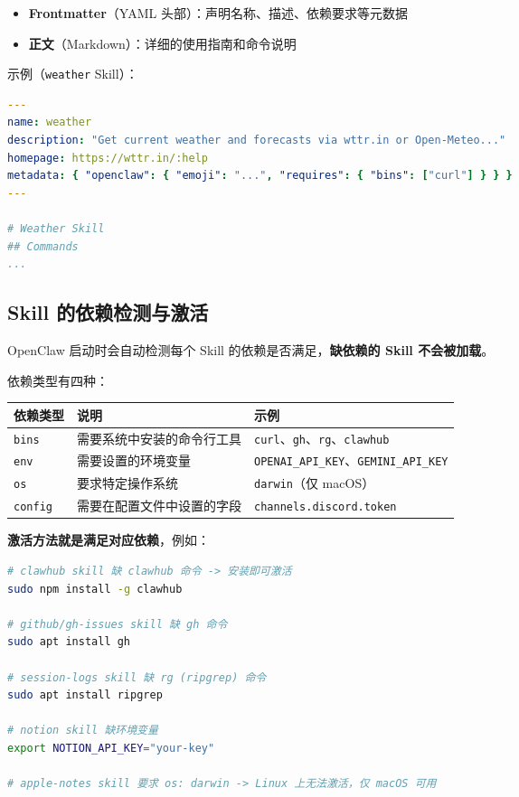 \begin{itemize}
  \item \textbf{Frontmatter}（YAML 头部）：声明名称、描述、依赖要求等元数据
  \item \textbf{正文}（Markdown）：详细的使用指南和命令说明
\end{itemize}

示例（\texttt{weather} Skill）：

\begin{lstlisting}[language=yaml]
---
name: weather
description: "Get current weather and forecasts via wttr.in or Open-Meteo..."
homepage: https://wttr.in/:help
metadata: { "openclaw": { "emoji": "...", "requires": { "bins": ["curl"] } } }
---

# Weather Skill
## Commands
...
\end{lstlisting}

\subsection{Skill 的依赖检测与激活}


OpenClaw 启动时会自动检测每个 Skill 的依赖是否满足，\textbf{缺依赖的 Skill 不会被加载}。

依赖类型有四种：

\begin{table}[h]
\centering
\small
\begin{tabular}{|l|l|l|}
\hline
依赖类型 & 说明 & 示例 \\
\hline
\texttt{bins} & 需要系统中安装的命令行工具 & \texttt{curl}、\texttt{gh}、\texttt{rg}、\texttt{clawhub} \\
\hline
\texttt{env} & 需要设置的环境变量 & \texttt{OPENAI\_API\_KEY}、\texttt{GEMINI\_API\_KEY} \\
\hline
\texttt{os} & 要求特定操作系统 & \texttt{darwin}（仅 macOS） \\
\hline
\texttt{config} & 需要在配置文件中设置的字段 & \texttt{channels.discord.token} \\
\hline
\end{tabular}
\end{table}

\textbf{激活方法就是满足对应依赖}，例如：

\begin{lstlisting}[language=bash]
# clawhub skill 缺 clawhub 命令 -> 安装即可激活
sudo npm install -g clawhub

# github/gh-issues skill 缺 gh 命令
sudo apt install gh

# session-logs skill 缺 rg (ripgrep) 命令
sudo apt install ripgrep

# notion skill 缺环境变量
export NOTION_API_KEY="your-key"

# apple-notes skill 要求 os: darwin -> Linux 上无法激活，仅 macOS 可用
\end{lstlisting}

